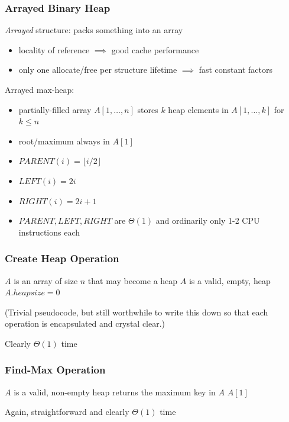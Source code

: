 \documentclass{beamer}
\begin{document}
\begin{frame} \frametitle{Arrayed Binary Heap}

\emph{Arrayed} structure: packs something into an array
\begin{itemize}
  \item locality of reference $\implies$ good cache performance
  \item only one allocate/free per structure lifetime $\implies$ fast constant factors
\end{itemize}

Arrayed max-heap:
\begin{itemize}
  \item partially-filled array $A[1, \ldots, n]$ stores $k$ heap elements in $A[1, \ldots, k]$ for $k \leq n$
  \item root/maximum always in $A[1]$
  \item $PARENT(i) = \lfloor i/2 \rfloor$
  \item $LEFT(i) = 2i$
  \item $RIGHT(i) = 2i+1$
  \item $PARENT, LEFT, RIGHT$ are $\Theta(1)$ and ordinarily only 1-2 CPU instructions each
\end{itemize}
\end{frame}

\begin{frame} \frametitle{Create Heap Operation}
  \begin{algorithmic}[1]
    \Require $A$ is an array of size $n$ that may become a heap
    \Ensure $A$ is a valid, empty, heap
    \State $A.heapsize = 0$
    \EndFunction
  \end{algorithmic}

  (Trivial pseudocode, but still worthwhile to write this down so that each operation
   is encapsulated and crystal clear.)

  Clearly $\Theta(1)$ time
\end{frame}

\begin{frame} \frametitle{Find-Max Operation}
\begin{algorithmic}[1]
  \Require $A$ is a valid, non-empty heap
  \Ensure returns the maximum key in $A$
  \State \Return $A[1]$
  \EndFunction
\end{algorithmic}

Again, straightforward and clearly $\Theta(1)$ time
\end{frame}
\end{document}
